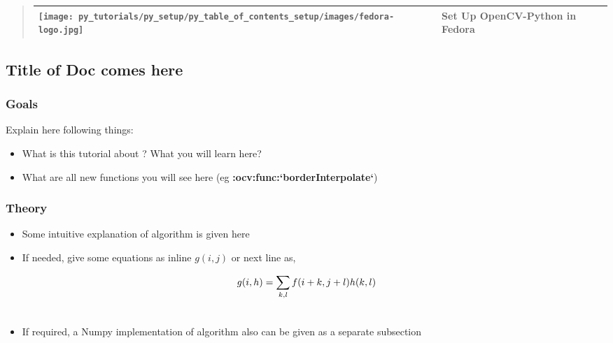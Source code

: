 \documentclass[letterpaper,10pt,english]{sphinxmanual}
\begin{document}
\begin{quote}

\begin{tabulary}{\linewidth}{m{100pt} m{300pt}}
\hline

\texttt{[image: py\_tutorials/py\_setup/py\_table\_of\_contents\_setup/images/fedora-logo.jpg]}
 & 
Set Up OpenCV-Python in Fedora
\\\hline
\end{tabulary}

\end{quote}
\pagebreak

\subsection{Title of Doc comes here}
\label{py_tutorials/py_setup/py_tutorial_template/py_tutorial_template:tutorial-template}\label{py_tutorials/py_setup/py_tutorial_template/py_tutorial_template::doc}\label{py_tutorials/py_setup/py_tutorial_template/py_tutorial_template:title-of-doc-comes-here}

\subsubsection{Goals}
\label{py_tutorials/py_setup/py_tutorial_template/py_tutorial_template:goals}
Explain here following things:
\begin{itemize}
\item {} 
What is this tutorial about ? What you will learn here?

\item {} 
What are all new functions you will see here (eg {\color{red}\bfseries{}:ocv:func:{}`borderInterpolate{}`})

\end{itemize}


\subsubsection{Theory}
\label{py_tutorials/py_setup/py_tutorial_template/py_tutorial_template:theory}\begin{itemize}
\item {} 
Some intuitive explanation of algorithm is given here

\item {} 
If needed, give some equations as inline $g(i,j)$ or next line as,

\end{itemize}
\begin{gather}
\begin{split}g(i,h) = \sum_{k,l} f(i+k, j+l) h(k,l)\end{split}\notag\\\begin{split}\end{split}\notag
\end{gather}\begin{itemize}
\item {} 
If required, a Numpy implementation of algorithm also can be given as a separate subsection

\end{itemize}
\end{document}

